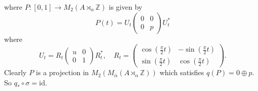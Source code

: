 \documentclass[11pt]{amsart}
\newcommand{\Z}{\mathbb{Z}}
\begin{document}
where
$P:[0,1]\rightarrow M_2(A \rtimes_\alpha \mathbb{Z})$ is given by 
	$$P(t)=U_t \begin{pmatrix}
		0 & 0\\
		0 & p
	\end{pmatrix} U_t^*$$
	where 
	$$U_t=R_t\begin{pmatrix}
		u & 0\\
		0 & 1
	\end{pmatrix}R_t^*,\quad R_t=\begin{pmatrix}
		\cos{(\frac{\pi}{2}t)} & -\sin{(\frac{\pi}{2}t)}\\
		\sin{(\frac{\pi}{2}t)} & \cos{(\frac{\pi}{2}t)}
	\end{pmatrix}.$$
Clearly $P$ is a projection in 
$M_2(M_{\bar{\alpha}} (A \rtimes_\alpha \Z) )$ 
which satisfies $q(P)=0 \oplus p$. So $q_*\circ \sigma = \mathrm{id}$.
\end{document}
